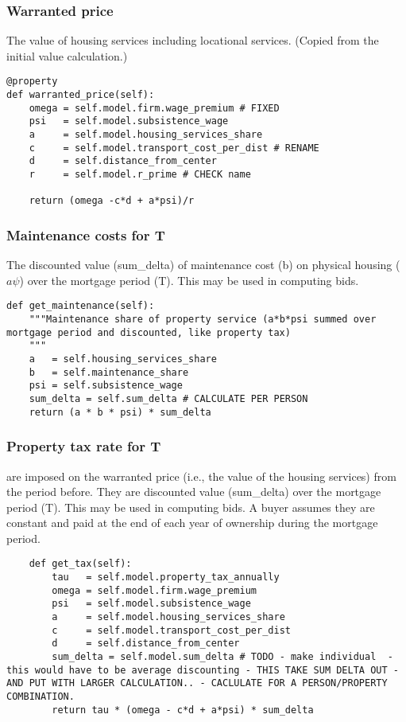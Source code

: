 \subsubsection{Warranted price} The value of housing services including locational services. (Copied from the initial value calculation.)
\begin{lstlisting}
@property
def warranted_price(self):
    omega = self.model.firm.wage_premium # FIXED
    psi   = self.model.subsistence_wage
    a     = self.model.housing_services_share
    c     = self.model.transport_cost_per_dist # RENAME
    d     = self.distance_from_center
    r     = self.model.r_prime # CHECK name
  
    return (omega -c*d + a*psi)/r
\end{lstlisting}

\subsubsection{Maintenance costs for T} The discounted value (sum\_delta) of maintenance cost (b) on  physical housing ($a\psi$) over the mortgage period (T). This may be used in computing bids.
\begin{lstlisting}
def get_maintenance(self):
    """Maintenance share of property service (a*b*psi summed over mortgage period and discounted, like property tax)
    """
    a   = self.housing_services_share
    b   = self.maintenance_share
    psi = self.subsistence_wage
    sum_delta = self.sum_delta # CALCULATE PER PERSON
    return (a * b * psi) * sum_delta  
\end{lstlisting}

\subsubsection{Property tax rate for  T}
are imposed on the  warranted price (i.e., the value of the housing services) from the period before. They  are discounted value (sum\_delta)  over the mortgage period (T). This may be used in computing bids. A buyer assumes they are constant and paid at the end of each year of ownership during the mortgage period.
\begin{lstlisting}
    def get_tax(self):
        tau   = self.model.property_tax_annually
        omega = self.model.firm.wage_premium 
        psi   = self.model.subsistence_wage
        a     = self.model.housing_services_share
        c     = self.model.transport_cost_per_dist
        d     = self.distance_from_center
        sum_delta = self.model.sum_delta # TODO - make individual  - this would have to be average discounting - THIS TAKE SUM DELTA OUT - AND PUT WITH LARGER CALCULATION.. - CACLULATE FOR A PERSON/PROPERTY COMBINATION.
        return tau * (omega - c*d + a*psi) * sum_delta
\end{lstlisting}

